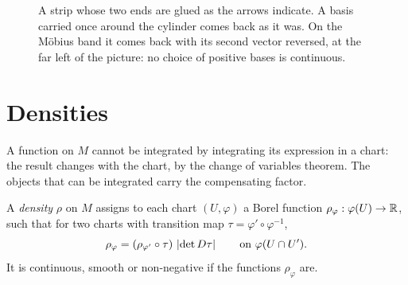 \begin{notechapter}
\begin{figure}[ht]
\centering
{}
\caption{A strip whose two ends are glued as the arrows indicate. A
basis carried once around the cylinder comes back as it was. On the
M\"obius band it comes back with its second vector reversed, at the far
left of the picture: no choice of positive bases is continuous.}
\label{stokes:fig:moebius}
\end{figure}

\section{Densities}\label{stokes:sec:densities}

A function on $M$ cannot be integrated by integrating its expression in
a chart: the result changes with the chart, by the change of variables
theorem. The objects that can be integrated carry the compensating
factor.

\begin{definition}[Density]\label{stokes:def:density}
A \emph{density} $\rho$ on $M$ assigns to each chart $(U, \varphi)$ a
Borel function $\rho_\varphi:\varphi(U)\to\mathbb{R}$, such that for two charts
with transition map $\tau = \varphi'\circ\varphi^{-1}$,
\begin{equation}\label{stokes:eq:density}
  \rho_\varphi = (\rho_{\varphi'}\circ\tau)\,\left|\det D\tau\right|
  \qquad\text{on }\varphi(U\cap U') .
\end{equation}
It is continuous, smooth or non-negative if the functions
$\rho_\varphi$ are.
\end{definition}


\end{notechapter}
